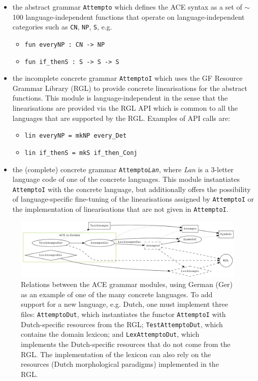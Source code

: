 \documentclass[a4paper]{article}
\begin{document}
\begin{itemize}
\item the abstract grammar \texttt{Attempto} which defines the ACE syntax as
a set of $\sim$100 language-independent functions
that operate on language-independent categories such as \texttt{CN},
\texttt{NP}, \texttt{S}, e.g.
\begin{itemize}
\item \verb!fun everyNP : CN -> NP!
\item \verb!fun if_thenS : S -> S -> S!
\end{itemize}

\item the incomplete concrete grammar \texttt{AttemptoI} which uses the
GF Resource Grammar Library (RGL)
to provide concrete linearisations for the abstract functions.
This module
is language-independent in the sense that the linearisations are provided
via the RGL API which is common to all the languages that are supported by the
RGL. Examples of API calls are:
\begin{itemize}
\item \verb!lin everyNP = mkNP every_Det!
\item \verb!lin if_thenS = mkS if_then_Conj!
\end{itemize}

\item the (complete) concrete grammar \texttt{Attempto\textit{Lan}}, where
\textit{Lan} is a 3-letter language code of one of the concrete languages. This
module instantiates \texttt{AttemptoI} with the concrete language, but
additionally offers the possibility of language-specific fine-tuning of the
linearisations assigned by \texttt{AttemptoI} or the implementation of
linearisations that are not given in \texttt{AttemptoI}.
\end{itemize}

\begin{figure}[ht]
\centering
\includegraphics[width=0.99\textwidth]{modules}
\caption[Relations between the ACE grammar modules]
{Relations between the ACE grammar modules, using German (Ger) as an example
of one of the many concrete languages. To add support for a new language,
e.g. Dutch, one must implement three files:
\texttt{AttemptoDut}, which
instantiates the functor \texttt{AttemptoI} with Dutch-specific resources
from the RGL;
\texttt{TestAttemptoDut}, which contains the domain lexicon; and
\texttt{LexAttemptoDut}, which implements the Dutch-specific resources that
do not come from the RGL. The implementation of the lexicon can also
rely on the resources (Dutch morphological paradigms) implemented
in the RGL.}
\label{fig:modules}
\end{figure}
\end{document}
